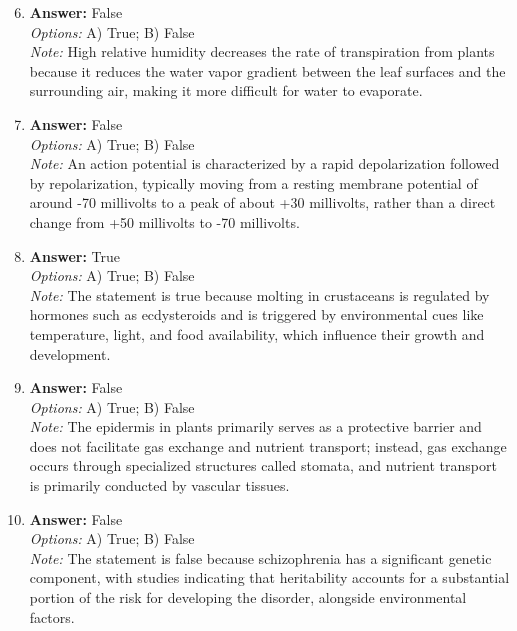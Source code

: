 \documentclass[12pt]{article}
\begin{document}
\begin{enumerate}[label=\arabic*.]
\setcounter{enumi}{5}
\item \textbf{Answer:} False
\\ \textit{Options:} A) True; B) False
\\ \textit{Note:} High relative humidity decreases the rate of transpiration from plants because it reduces the water vapor gradient between the leaf surfaces and the surrounding air, making it more difficult for water to evaporate.
\item \textbf{Answer:} False
\\ \textit{Options:} A) True; B) False
\\ \textit{Note:} An action potential is characterized by a rapid depolarization followed by repolarization, typically moving from a resting membrane potential of around -70 millivolts to a peak of about +30 millivolts, rather than a direct change from +50 millivolts to -70 millivolts.
\item \textbf{Answer:} True
\\ \textit{Options:} A) True; B) False
\\ \textit{Note:} The statement is true because molting in crustaceans is regulated by hormones such as ecdysteroids and is triggered by environmental cues like temperature, light, and food availability, which influence their growth and development.
\item \textbf{Answer:} False
\\ \textit{Options:} A) True; B) False
\\ \textit{Note:} The epidermis in plants primarily serves as a protective barrier and does not facilitate gas exchange and nutrient transport; instead, gas exchange occurs through specialized structures called stomata, and nutrient transport is primarily conducted by vascular tissues.
\item \textbf{Answer:} False
\\ \textit{Options:} A) True; B) False
\\ \textit{Note:} The statement is false because schizophrenia has a significant genetic component, with studies indicating that heritability accounts for a substantial portion of the risk for developing the disorder, alongside environmental factors.
\end{enumerate}
\end{document}
